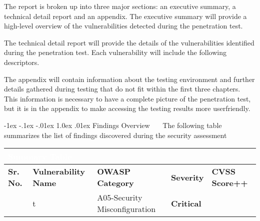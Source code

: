 \documentclass{article}
\makeatletter
\renewcommand{\section}{\@startsection{section}{1}{\z@}%
            {-1ex \@plus -.1ex \@minus -.01ex}%
            {1.0ex \@plus  .01ex}%
            {\normalfont\large\bfseries\color{sectioncolor}}}
\makeatother
\begin{document}
            \noindent \large The report is broken up into three major sections: an executive summary, a technical detail report and an appendix. The executive summary will provide a high-level overview of the vulnerabilities detected
            during the penetration test.

            \noindent \large The technical detail report will provide the details of the vulnerabilities identified during the penetration test. Each vulnerability will include the following descriptors.
            
            \noindent \large The appendix will contain information about the testing environment and further details gathered during testing that do not fit within the first three chapters. 
            This information is necessary to have a complete picture of the penetration test, but it is in the appendix to make accessing the testing results more userfriendly.


            \newpage
            \section{\large Findings Overview}
            \ \  \ The following table summarizes the list of findings discovered during the security assessment
            \begin{center}
                \begin{longtable} {|p{2em}|p{20em}|>{\raggedright\arraybackslash}p{7em}|>{\centering\arraybackslash}p{4em}|>{\centering\arraybackslash}p{3em}|}
                    \hline 
                    \multicolumn{5}{|p{40.2em}|}{\large \cellcolor{tablecol} \textcolor{white}{\textbf{Summary Table}}} \\
                    \hline
                    \normalsize \cellcolor{tableco2} \textbf{Sr. No.} & \normalsize \cellcolor{tableco2} \textbf{Vulnerability Name} & \normalsize \cellcolor{tableco2} \textbf{OWASP Category} & \normalsize \cellcolor{tableco2} \textbf{Severity} & \normalsize \cellcolor{tableco2} \textbf{CVSS Score++} \\    
                    \hline
                    
                    \normalsize \center 1 & \normalsize t & \normalsize A05-Security Misconfiguration  & \normalsize \textbf{\textcolor{critical}{Critical}} &  9 \\
                    \hline
                     
                \end{longtable}   
            \end{center}
            
\end{document}
